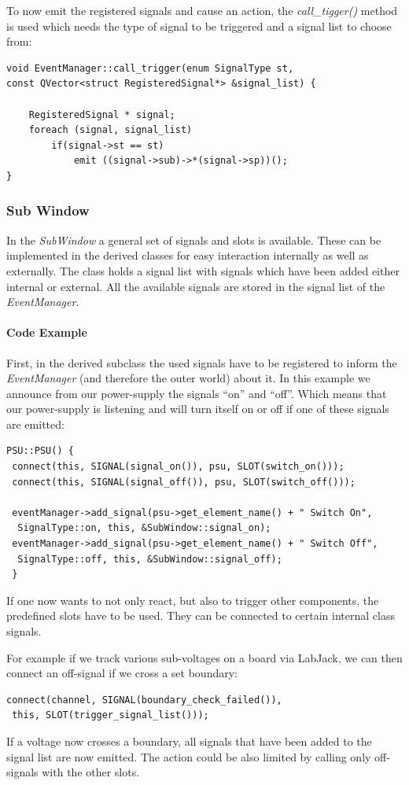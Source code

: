 \documentclass[10pt,a4paper]{article}
\begin{document}
		To now emit the registered signals and cause an action, the \textit{call\_tigger()} method is used which needs the type of signal to be triggered and a signal list to choose from:
		
\begin{lstlisting}[caption=EventManager.cpp]
void EventManager::call_trigger(enum SignalType st,
const QVector<struct RegisteredSignal*> &signal_list) {

    RegisteredSignal * signal;
    foreach (signal, signal_list)
        if(signal->st == st)
            emit ((signal->sub)->*(signal->sp))();
}
\end{lstlisting}

	\subsubsection{Sub Window}
	
	In the \textit{SubWindow} a general set of signals and slots is available. These can be implemented in the derived classes for easy interaction internally as well as externally. The class holds a signal list with signals which have been added either internal or external. All the available signals are stored in the signal list of the \textit{EventManager}.

		\paragraph{Code Example}

		First, in the derived subclass the used signals have to be registered to inform the \textit{EventManager} (and therefore the outer world) about it. In this example we announce from our power-supply the signals \enquote{on} and \enquote{off}. Which means that our power-supply is listening and will turn itself on or off if one of these signals are emitted:

\newpage		
\begin{lstlisting}[caption=PSU.cpp]
PSU::PSU() {
 connect(this, SIGNAL(signal_on()), psu, SLOT(switch_on()));
 connect(this, SIGNAL(signal_off()), psu, SLOT(switch_off()));

 eventManager->add_signal(psu->get_element_name() + " Switch On",
  SignalType::on, this, &SubWindow::signal_on);
 eventManager->add_signal(psu->get_element_name() + " Switch Off",
  SignalType::off, this, &SubWindow::signal_off);
 }
\end{lstlisting}

If one now wants to not only react, but also to trigger other components, the predefined slots have to be used. They can be connected to certain internal class signals. 

For example if we track various sub-voltages on a board via LabJack, we can then connect an off-signal if we cross a set boundary:

\begin{lstlisting}[caption=PSU.cpp]
connect(channel, SIGNAL(boundary_check_failed()),
 this, SLOT(trigger_signal_list()));
\end{lstlisting}

If a voltage now crosses a boundary, all signals that have been added to the signal list are now emitted. The action could be also limited by calling only off-signals with the other slots.
\end{document}
